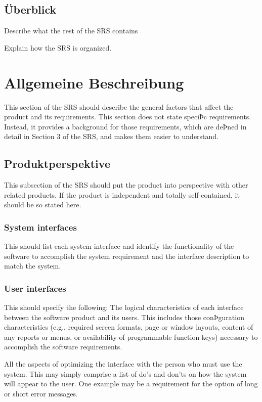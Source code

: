 	\subsection{Überblick}	
		Describe what the rest of the SRS contains
		
		Explain how the SRS is organized.

\section{Allgemeine Beschreibung}
	This section of the SRS should describe the general factors that affect the product and its requirements. This section does not state speciÞc requirements. Instead, it provides a background for those requirements, which are deÞned in detail in Section 3 of the SRS, and makes them easier to understand.

	\subsection{Produktperspektive}
		This subsection of the SRS should put the product into perspective with other related products. If the product
is independent and totally self-contained, it should be so stated here.

		\subsubsection{System interfaces}
			This should list each system interface and identify the functionality of the software to accomplish the system
requirement and the interface description to match the system.
		
		\subsubsection{User interfaces}
			This should specify the following:
			The logical characteristics of each interface between the software product and its users. This includes those conÞguration characteristics (e.g., required screen formats, page or window layouts, content of any reports or menus, or availability of programmable function keys) necessary to accomplish the software requirements.
			
			All the aspects of optimizing the interface with the person who must use the system. This may simply comprise a list of do's and don'ts on how the system will appear to the user. One example may be a requirement for the option of long or short error messages.
		
